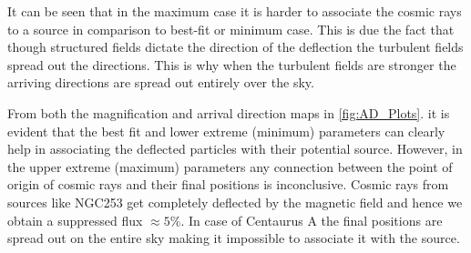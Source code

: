 \documentclass[usenatbib]{mnras}
\begin{document}
\begin{enumerate}
    It can be seen that in the maximum case it is harder to associate the cosmic rays to a source in comparison to best-fit or minimum case. This is due the fact that though structured fields dictate the direction of the deflection the turbulent fields spread out the directions. This is why when the turbulent fields are stronger the arriving directions are spread out entirely over the sky.
    \end{enumerate}
    
From both the magnification and arrival direction maps in \ref{fig:AD_Plots}. it is evident that the best fit and lower extreme (minimum) parameters can clearly help in associating the deflected particles with their potential source. However, in the upper extreme (maximum) parameters any connection between the point of origin of cosmic rays and their final positions is inconclusive. Cosmic rays from  sources like NGC253 get completely deflected by the magnetic field and hence we obtain a suppressed flux $\approx 5\%$. In case of Centaurus A the final positions are spread out on the entire sky making it impossible to associate it with the source.






\end{document}
